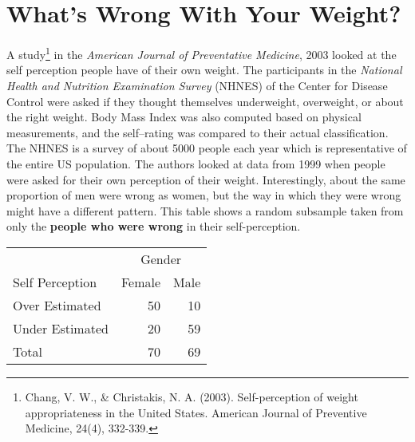 \def\theTopic{Weight Awareness}
\def\dayNum{13 }

\section{ What's Wrong With Your Weight?}


A study\footnote{Chang, V. W., \& Christakis,
  N. A. (2003). Self-perception of weight appropriateness in the
  United States. American Journal of Preventive Medicine, 24(4),
  332-339.}  in the {\em American Journal of Preventative Medicine},
  2003 looked at the self perception people have of their own weight.
  The participants in the {\em National Health and Nutrition
    Examination Survey} (NHNES) of the Center for Disease Control were
  asked  if they thought themselves underweight, overweight, or about
  the right weight.  Body Mass Index was also computed based on
  physical measurements, and the self--rating was compared to their
  actual classification.  The NHNES is a survey of about 5000 people each year
  which is representative of the entire US population.  The authors
  looked at data from 1999 when people were asked for their own
  perception of their weight. Interestingly, about the same
  proportion of men were wrong as women, but the way in which they
  were wrong might have a different pattern.  This table shows a
  random subsample taken from only the
  {\bf people who were wrong} in their self-perception.

  \begin{tabular}{|l|r|r|} \hline
       & \multicolumn{2}{|c|}{Gender} \\
Self Perception &Female  & Male \\ \hline
Over Estimated  &  50&  10  \\ \hline
Under Estimated &  20  & 59  \\ \hline
Total  &  70 & 69\\ \hline
  \end{tabular}
  
